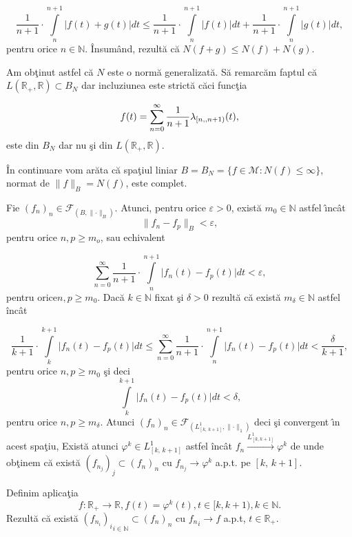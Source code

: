 \documentclass[ a4paper, 12pt]{report}
\theoremstyle{definition}
\theoremstyle{remark}
\numberwithin{equation}{section}
\begin{document}
$$\frac{1}{n+1} \cdot \int\limits_{n}^{n+1}{\lvert f(t) + g(t) \rvert dt} \leq \frac{1}{n+1} \cdot \int\limits_{n}^{n+1}{\lvert f(t) \rvert dt} + \frac{1}{n+1} \cdot\int\limits_{n}^{n+1}{\lvert g(t) \rvert dt},$$ pentru orice $n \in \mathbb{N}$. \^ Insum\^ and, rezult\u a c\u a $N(f+g) \leq N(f) + N(g)$.

Am ob\c tinut astfel c\u a $N$ este o norm\u a generalizat\u a. S\u a remarc\u am faptul c\u a $ L(\mathbb{R}_+ , \mathbb{R}) \subset B_N$ dar incluziunea este strict\u a c\u aci func\c tia

$$f(t) = \sum\limits_{n = 0}^\infty \displaystyle\frac{1}{n + 1}\lambda_{[n, \\, n + 1)}(t),$$ este din $B_N$ dar nu \c si din $L(\mathbb{R}_+ , \mathbb{R})$.

\medskip

\^ In continuare vom ar\u ata c\u a spa\c tiul liniar
$B = B_N = \{f \in \mathcal{M} : N(f) \leq \infty\}$, normat de $\lVert f \rVert_B = N(f)$, este complet.

Fie $(f_n)_n \in \mathcal{F}_{(B, \lVert \cdot \rVert_B)}$. Atunci, pentru orice $\varepsilon > 0$, exist\u a $m_0 \in \mathbb{N}$ astfel \^\i nc\^ at
$$\lVert f_n - f_p \rVert_B < \varepsilon,$$  pentru orice $n,p \geq m_o$, sau echivalent

$$\sum\limits_{n=0}^{\infty}{ \frac{1}{n+1} \cdot\int\limits_{n}^{n+1}{\lvert f_n {(t)} - f_p{(t)} \rvert dt }} < \varepsilon,$$ pentru orice$n,p \geq m_0$. Dac\u a $k \in \mathbb{N}$ fixat \c si $\delta>0$ rezult\u a c\u a exist\u a $m_\delta \in \mathbb{N}$ astfel \^inc\^ at

$$\frac{1}{k+1}\cdot\int\limits_{k}^{k+1}{\lvert f_n {(t)} - f_p{(t)} \rvert dt}
\leq\sum\limits_{n=0}^{\infty}\frac{1}{n+1}\cdot\int\limits_{n}^{n+1}\lvert f_n{(t)}-f_p{(t)}\rvert dt < \frac{\delta}{k+1},$$ pentru orice $n,p \geq m_0$ \c si deci
$$\int\limits_{k}^{k+1}\lvert f_n({t})-f_p({t})\rvert dt<\delta,$$ pentru orice $n, p\geq m_\delta$. Atunci $(f_n)_n \in \mathcal{F}_{(L^1_{[k,\, k+1]}, \lVert \cdot \rVert_1)}$ deci \c si convergent \^\i n acest spa\c tiu, Exist\u a atunci $\varphi^k \in L^1_{[k,\, k+1]}$ astfel \^inc\^ at $f_n\xrightarrow{L^1_{[k,k+1]}} \varphi^k$ de unde ob\c tinem c\u a exist\u a $({f_{n_j}})_j\subset (f_n)_n$ cu $f_{n_j}\xrightarrow{}\varphi^k$ a.p.t. pe $[k,\, k+1]$.


Definim aplica\c tia
$$f:{\mathbb{R}}_+ \xrightarrow{}  \mathbb{R} , f(t)={ \varphi^k}(t) , t \in[k,k+1), k \in \mathbb{N}.$$
Rezult\u a c\u a exist\u a ${({f_{n_i}})_i}_{i \in \mathbb{N}} \subset (f_n)_n$ cu ${f_n}_i\xrightarrow{}f$ a.p.t, $t \in \mathbb{R}_+.$
\end{document}
